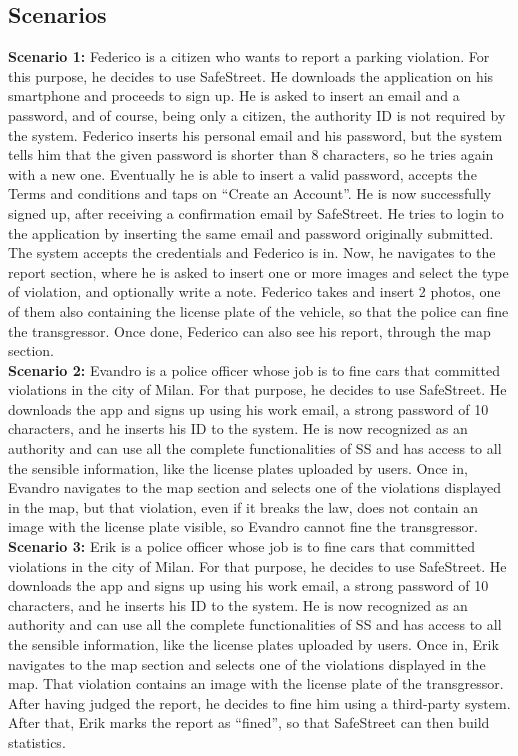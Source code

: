 \documentclass[../RASD.tex]{subfiles}
\begin{document}
        \subsection{Scenarios}\label{subsec:scenarios}
            \textbf{Scenario 1:} Federico is a citizen who wants to report a parking violation. For this purpose, he decides to use SafeStreet. He downloads the application on his smartphone and proceeds to sign up. He is asked to insert an email and a password, and of course, being only a citizen, the authority ID is not required by the system. Federico inserts his personal email and his password, but the system tells him that the given password is shorter than 8 characters, so he tries again with a new one. Eventually he is able to insert a valid password, accepts the Terms and conditions and taps on “Create an Account”. He is now successfully signed up, after receiving a confirmation email by SafeStreet. He tries to login to the application by inserting the same email and password originally submitted. The system accepts the credentials and Federico is in. Now, he navigates to the report section, where he is asked to insert one or more images and select the type of violation, and optionally write a note. Federico takes and insert 2 photos, one of them also containing the license plate of the vehicle, so that the police can fine the transgressor. Once done, Federico can also see his report, through the map section.
            \\
            \textbf{Scenario 2:} Evandro is a police officer whose job is to fine cars that committed violations in the city of Milan. For that purpose, he decides to use SafeStreet. He downloads the app and signs up using his work email, a strong password of 10 characters, and he inserts his ID to the system. He is now recognized as an authority and can use all the complete functionalities of SS and has access to all the sensible information, like the license plates uploaded by users. Once in, Evandro navigates to the map section and selects one of the violations displayed in the map, but that violation, even if it breaks the law, does not contain an image with the license plate visible, so Evandro cannot fine the transgressor.
            \\
            \textbf{Scenario 3:} Erik is a police officer whose job is to fine cars that committed violations in the city of Milan. For that purpose, he decides to use SafeStreet. He downloads the app and signs up using his work email, a strong password of 10 characters, and he inserts his ID to the system. He is now recognized as an authority and can use all the complete functionalities of SS and has access to all the sensible information, like the license plates uploaded by users. Once in, Erik navigates to the map section and selects one of the violations displayed in the map. That violation contains an image with the license plate of the transgressor. After having judged the report, he decides to fine him using a third-party system. After that, Erik marks the report as “fined”, so that SafeStreet can then build statistics.
\end{document}
